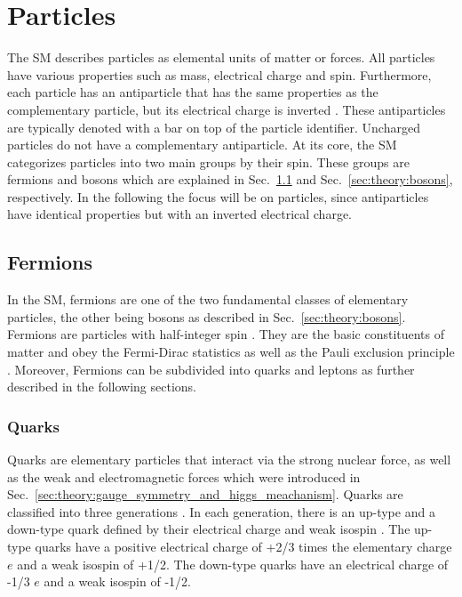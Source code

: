 \documentclass[bachelor,ngerman,english]{GAUBM}
\begin{document}
\section{Particles}
The SM describes particles as elemental units of matter or forces. All particles have various properties such as mass, electrical charge and spin. Furthermore, each particle has an antiparticle that has the same properties as the complementary particle, but its electrical charge is inverted \cite{theory:general_particles_nuclei,theory:general_sm}. These antiparticles are typically denoted with a bar on top of the particle identifier. Uncharged particles do not have a complementary antiparticle. At its core, the SM categorizes particles into two main groups by their spin. These groups are fermions and bosons which are explained in Sec.~\ref{sec:theory:fermions} and Sec.~\ref{sec:theory:bosons}, respectively. In the following the focus will be on particles, since antiparticles have identical properties but with an inverted electrical charge. 


\subsection{Fermions}
\label{sec:theory:fermions}
In the SM, fermions are one of the two fundamental classes of elementary particles, the other being bosons as described in Sec.~\ref{sec:theory:bosons}. Fermions are particles with half-integer spin \cite{theory:general_sm}. They are the basic constituents of matter and obey the Fermi-Dirac statistics as well as the Pauli exclusion principle \cite{theory:fermions_bosons}. Moreover, Fermions can be subdivided into quarks and leptons as further described in the following sections. 

\subsubsection*{Quarks}
Quarks are elementary particles that interact via the strong nuclear force, as well as the weak and electromagnetic forces which were introduced in Sec.~\ref{sec:theory:gauge_symmetry_and_higgs_meachanism}. Quarks are classified into three generations \cite{theory:general_sm}. In each generation, there is an up-type and a down-type quark defined by their electrical charge and weak isospin \cite{theory:fermions_01}. The up-type quarks have a positive electrical charge of +2/3 times the elementary charge $e$ and a weak isospin of +1/2. The down-type quarks have an electrical charge of -1/3 $e$ and a weak isospin of -1/2. 
\end{document}
